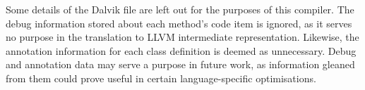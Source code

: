 Some details of the Dalvik file are left out for the purposes of this compiler. The debug information stored about each method's code item is ignored, as it serves no purpose in the translation to LLVM intermediate representation. Likewise, the annotation information for each class definition is deemed as unnecessary. Debug and annotation data may serve a purpose in future work, as information gleaned from them could prove useful in certain language-specific optimisations.
